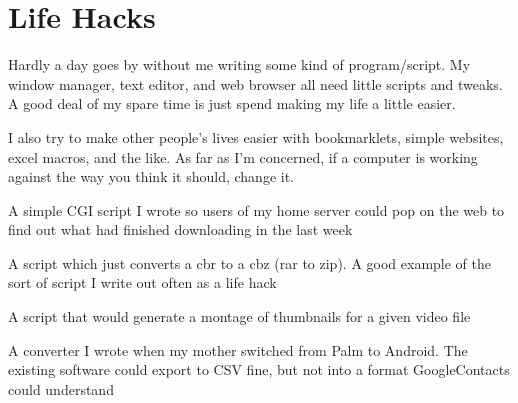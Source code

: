 \section{Life Hacks}

Hardly a day goes by without me writing some kind of program/script. My
window manager, text editor, and web browser all need little scripts
and tweaks. A good deal of my spare time is just spend making my life a
little easier.

I also try to make other people's lives easier with bookmarklets, simple
websites, excel macros, and the like. As far as I'm concerned, if a
computer is working against the way you think it should, change it.

{A simple CGI script I wrote so users of my home server could pop on the web to find out what had finished downloading in the last week}

{A script which just converts a cbr to a cbz (rar to zip).  A good example of the sort of script I write out often as a life hack}

{A script that would generate a montage of thumbnails for a given video file}

{A converter I wrote when my mother switched from Palm to Android. The existing software could export to CSV fine, but not into a format GoogleContacts could understand}
